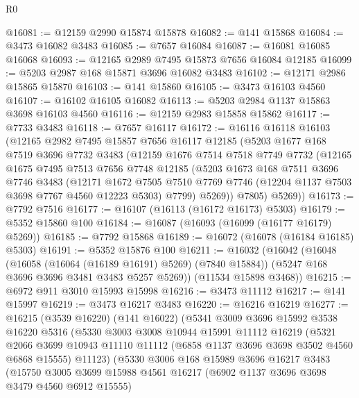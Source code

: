 \begin{lexlean}{R0}
\begin{coremodule}
@16081 := @12159 @2990 @15874 @15878
@16082 := @141 @15868
@16084 := @3473 @16082 @3483
@16085 := @7657 @16084
@16087 := @16081 @16085 @16068
@16093 := @12165 @2989 @7495 @15873 @7656 @16084 @12185
@16099 := @5203 @2987 @168 @15871 @3696 @16082 @3483
@16102 := @12171 @2986 @15865 @15870
@16103 := @141 @15860
@16105 := @3473 @16103 @4560
@16107 := @16102 @16105 @16082
@16113 := @5203 @2984 @1137 @15863 @3698 @16103 @4560
@16116 := @12159 @2983 @15858 @15862
@16117 := @7733 @3483
@16118 := @7657 @16117
@16172 := @16116
    @16118
    @16103
    (@12165
      @2982
      @7495
      @15857
      @7656
      @16117
      @12185
      (@5203
        @1677
        @168
        @7519
        @3696
        @7732
        @3483
        (@12159
          @1676
          @7514
          @7518
          @7749
          @7732
          (@12165
            @1675
            @7495
            @7513
            @7656
            @7748
            @12185
            (@5203
              @1673
              @168
              @7511
              @3696
              @7746
              @3483
              (@12171
                @1672
                @7505
                @7510
                @7769
                @7746
                (@12204 @1137 @7503 @3698 @7767 @4560 @12223 @5303)
                @7799)
              @5269))
          @7805)
        @5269))
@16173 := @7792 @7516
@16177 := @16107 (@16113 (@16172 @16173) @5303)
@16179 := @5352 @15860 @100
@16184 := @16087 (@16093 (@16099 (@16177 @16179) @5269))
@16185 := @7792 @15868
@16189 := @16072 (@16078 (@16184 @16185) @5303)
@16191 := @5352 @15876 @100
@16211 := @16032
    (@16042
      (@16048
        (@16058 (@16064 (@16189 @16191) @5269) (@7840 @15884))
        (@5247 @168 @3696 @3696 @3481 @3483 @5257 @5269))
      (@11534 @15898 @3468))
@16215 := @6972 @911 @3010 @15993 @15998
@16216 := @3473 @11112
@16217 := @141 @15997
@16219 := @3473 @16217 @3483
@16220 := @16216 @16219
@16277 := @16215
    (@3539 @16220)
    (@141 @16022)
    (@5341
      @3009
      @3696
      @15992
      @3538
      @16220
      @5316
      (@5330
        @3003
        @3008
        @10944
        @15991
        @11112
        @16219
        (@5321
          @2066
          @3699
          @10943
          @11110
          @11112
          (@6858 @1137 @3696 @3698 @3502 @4560 @6868 @15555)
          @11123)
        (@5330
          @3006
          @168
          @15989
          @3696
          @16217
          @3483
          (@15750
            @3005
            @3699
            @15988
            @4561
            @16217
            (@6902 @1137 @3696 @3698 @3479 @4560 @6912 @15555)

\end{coremodule}
\end{lexlean}
